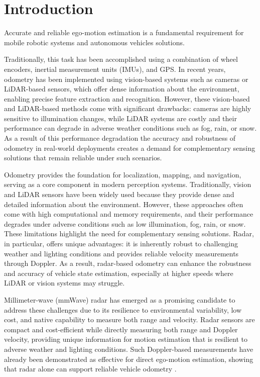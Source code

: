 \section{Introduction}
\label{sec:intoduction}

Accurate and reliable ego-motion estimation is a fundamental requirement for mobile robotic systems and autonomous vehicles solutions.

Traditionally, this task has been accomplished using a combination of wheel encoders, inertial measurement units (IMUs), and GPS.
In recent years, odometry has been implemented using vision-based systems such as cameras or LiDAR-based sensors, which offer dense information about the environment, enabling precise feature extraction and recognition.
However, these vision-based and LiDAR-based methods come with significant drawbacks: cameras are highly sensitive to illumination changes, while LiDAR systems are costly and their performance can degrade in adverse weather conditions such as fog, rain, or snow.
As a result of this performance degradation the accuracy and robustness of odometry in real-world deployments creates a demand for complementary sensing solutions that remain reliable under such scenarios.
    
Odometry provides the foundation for localization, mapping, and navigation, serving as a core component in modern perception systems. 
Traditionally, vision and LiDAR sensors have been widely used because they provide dense and detailed information about the environment. 
However, these approaches often come with high computational and memory requirements, and their performance degrades under adverse conditions such as low illumination, fog, rain, or snow. 
These limitations highlight the need for complementary sensing solutions. Radar, in particular, offers unique advantages: it is inherently robust to challenging weather and lighting conditions and provides reliable velocity measurements through Doppler. 
As a result, radar-based odometry can enhance the robustness and accuracy of vehicle state estimation, especially at higher speeds where LiDAR or vision systems may struggle.

Millimeter-wave (mmWave) radar has emerged as a promising candidate to address these challenges due to its resilience to environmental variability, low cost, and native capability to measure both range and velocity.
Radar sensors are compact and cost-efficient while directly measuring both range and Doppler velocity, providing unique information for motion estimation that is resilient to adverse weather and lighting conditions.
Such Doppler-based measurements have already been demonstrated as effective for direct ego-motion estimation, showing that radar alone can support reliable vehicle odometry \cite{EgoMotion_DopplerRadar}.

